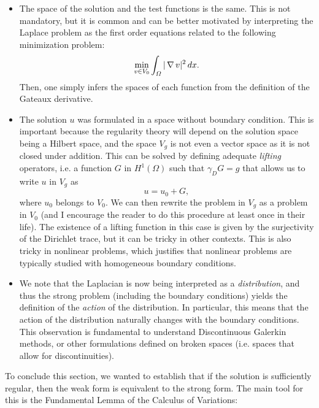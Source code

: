     \begin{itemize}
        \item The space of the solution and the test functions is the same. This is not mandatory, but it is common and can be better motivated by interpreting the Laplace problem as the first order equations related to the following minimization problem: 
            \begin{equation*}
\min_{v \in V_0} \int_\Omega |\operatorname{\nabla} v|^2\,dx .
\end{equation*}
        Then, one simply infers the spaces of each function from the definition of the Gateaux derivative. 
        \item The solution $u$ was formulated in a space without boundary condition. This is important because the regularity theory will depend on the solution space being a Hilbert space, and the space $V_g$ is not even a vector space as it is not closed under addition. This can be solved by defining adequate \emph{lifting} operators, i.e. a function $G$ in $H^1(\Omega)$ such that $\gamma_D G = g$ that allows us to write $u$ in $V_g$ as 
            \begin{equation*}
u = u_0 + G,
\end{equation*}
        where $u_0$ belongs to $V_0$. We can then rewrite the problem in $V_g$ as a problem in $V_0$ (and I encourage the reader to do this procedure at least once in their life). The existence of a lifting function in this case is given by the surjectivity of the Dirichlet trace, but it can be tricky in other contexts. This is also tricky in nonlinear problems, which justifies that nonlinear problems are typically studied with homogeneous boundary conditions.  
        \item We note that the Laplacian is now being interpreted as a \emph{distribution}, and thus the strong problem (including the boundary conditions) yields the definition of the \emph{action} of the distribution. In particular, this means that the action of the distribution naturally changes with the boundary conditions. This observation is fundamental to understand Discontinuous Galerkin methods, or other formulations defined on broken spaces (i.e. spaces that allow for discontinuities). 
    \end{itemize}

To conclude this section, we wanted to establish that if the solution is sufficiently regular, then the weak form is equivalent to the strong form. The main tool for this is the Fundamental Lemma of the Calculus of Variations: 


